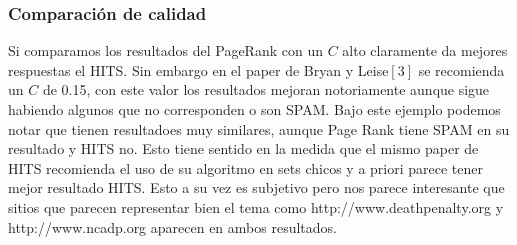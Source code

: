 \subsubsection{Comparación de calidad}

Si comparamos los resultados del PageRank con un $C$ alto claramente da mejores respuestas el HITS. Sin embargo en el paper de Bryan y Leise$[3]$ se recomienda un $C$ de 0.15, con este valor los resultados mejoran notoriamente aunque sigue habiendo algunos que no corresponden o son SPAM. 
Bajo este ejemplo podemos notar que tienen resultadoes muy similares, aunque Page Rank tiene SPAM en su resultado y HITS no. Esto tiene sentido en la medida que el mismo paper de HITS recomienda el uso de su algoritmo en sets chicos y a priori parece tener mejor resultado HITS. Esto a su vez es subjetivo pero nos parece interesante que sitios que parecen representar bien el tema como http://www.deathpenalty.org y http://www.ncadp.org aparecen en ambos resultados.

